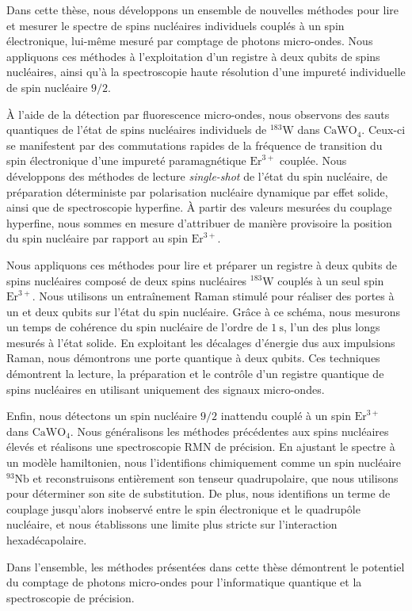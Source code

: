 Dans cette thèse, nous développons un ensemble de nouvelles méthodes pour lire et mesurer le spectre de spins nucléaires individuels couplés à un spin électronique, lui-même mesuré par comptage de photons micro-ondes. Nous appliquons ces méthodes à l'exploitation d'un registre à deux qubits de spins nucléaires, ainsi qu'à la spectroscopie haute résolution d'une impureté individuelle de spin nucléaire $9/2$.

À l'aide de la détection par fluorescence micro-ondes, nous observons des sauts quantiques de l'état de spins nucléaires individuels de $^{183}\mathrm{W}$ dans $\mathrm{CaWO}_4$. Ceux-ci se manifestent par des commutations rapides de la fréquence de transition du spin électronique d'une impureté paramagnétique $\mathrm{Er}^{3+}$ couplée. Nous développons des méthodes de lecture \textit{single-shot} de l'état du spin nucléaire, de préparation déterministe par polarisation nucléaire dynamique par effet solide, ainsi que de spectroscopie hyperfine. À partir des valeurs mesurées du couplage hyperfine, nous sommes en mesure d'attribuer de manière provisoire la position du spin nucléaire par rapport au spin $\mathrm{Er}^{3+}$.

Nous appliquons ces méthodes pour lire et préparer un registre à deux qubits de spins nucléaires composé de deux spins nucléaires $^{183}\mathrm{W}$ couplés à un seul spin $\mathrm{Er}^{3+}$. Nous utilisons un entraînement Raman stimulé pour réaliser des portes à un et deux qubits sur l'état du spin nucléaire. Grâce à ce schéma, nous mesurons un temps de cohérence du spin nucléaire de l'ordre de $1~\mathrm{s}$, l'un des plus longs mesurés à l'état solide. En exploitant les décalages d'énergie dus aux impulsions Raman, nous démontrons une porte quantique à deux qubits. Ces techniques démontrent la lecture, la préparation et le contrôle d'un registre quantique de spins nucléaires en utilisant uniquement des signaux micro-ondes.

Enfin, nous détectons un spin nucléaire $9/2$ inattendu couplé à un spin $\mathrm{Er}^{3+}$ dans $\mathrm{CaWO}_4$. Nous généralisons les méthodes précédentes aux spins nucléaires élevés et réalisons une spectroscopie RMN de précision. En ajustant le spectre à un modèle hamiltonien, nous l'identifions chimiquement comme un spin nucléaire $^{93}\mathrm{Nb}$ et reconstruisons entièrement son tenseur quadrupolaire, que nous utilisons pour déterminer son site de substitution. De plus, nous identifions un terme de couplage jusqu'alors inobservé entre le spin électronique et le quadrupôle nucléaire, et nous établissons une limite plus stricte sur l'interaction hexadécapolaire.

Dans l'ensemble, les méthodes présentées dans cette thèse démontrent le potentiel du comptage de photons micro-ondes pour l'informatique quantique et la spectroscopie de précision.
